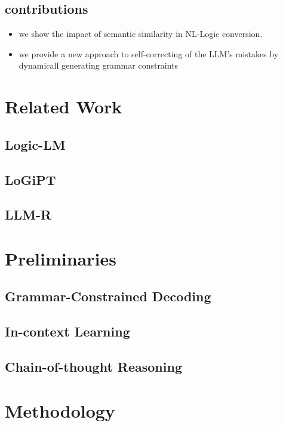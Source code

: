 \documentclass[conference]{IEEEtran}
\begin{document}
\subsection*{contributions}

\begin{itemize}
    \item we show the impact of semantic similarity in NL-Logic conversion.
    \item we provide a new approach to self-correcting of the LLM's mistakes by dynamicall generating
    grammar constraints
\end{itemize}

\section{Related Work}
\subsection{Logic-LM}

\subsection{LoGiPT}

\subsection{LLM-R}

\section{Preliminaries}
\subsection{Grammar-Constrained Decoding}

\subsection{In-context Learning}

\subsection{Chain-of-thought Reasoning}

\section{Methodology}
\end{document}
